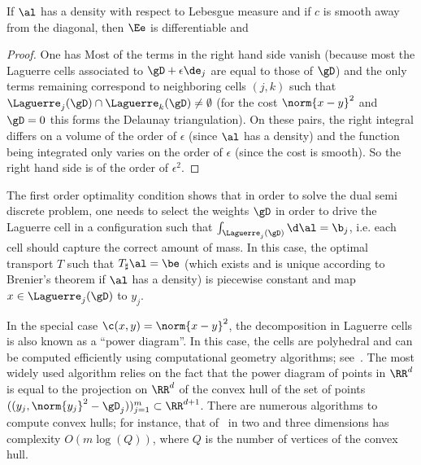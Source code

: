 \begin{prop}
If $\al$ has a density with respect to Lebesgue measure and if $c$ is smooth away from the diagonal, then $\Ee$ is differentiable and
\end{prop}
\begin{proof} 
	One has
	Most of the terms in the right hand side vanish (because most the Laguerre cells associated to $\gD+\epsilon\de_j$ are equal to those of $\gD$) and the only terms remaining correspond to neighboring cells $(j,k)$ such that 
	$\Laguerre_{j}(\gD) \cap \Laguerre_{k}(\gD) \neq \emptyset$ (for the cost $\norm{x-y}^2$ and $\gD=0$ this forms the Delaunay triangulation).
	On these pairs, the right integral differs on a volume of the order of $\epsilon$ (since $\al$ has a density) and the function being integrated only varies on the order of $\epsilon$ (since the cost is smooth). So the right hand side is of the order of $\epsilon^2$.
\end{proof}

The first order optimality condition shows that in order to solve the dual semi discrete problem, one needs to select the weights $\gD$ in order to drive the Laguerre cell in a configuration such that $\int_{\Laguerre_{j}(\gD)} \d\al = \b_j$, i.e. each cell should capture the correct amount of mass. In this case, the optimal transport $T$ such that $T_\sharp \al=\be$ (which exists and is unique according to Brenier's theorem if $\al$ has a density) is piecewise constant and map $x \in \Laguerre_{j}(\gD)$ to $y_j$.  

In the special case $\c(x,y)=\norm{x-y}^2$, the decomposition in Laguerre cells is also known as a ``power diagram''.  
%
In this case, the cells are polyhedral and can be computed efficiently using computational geometry algorithms; see~\cite{aurenhammer1987power}. 
%
The most widely used algorithm relies on the fact that the power diagram of points in $\RR^d$ is equal to the projection on $\RR^d$ of the convex hull of the set of points $( (y_j,\norm{y_j}^2 - \gD_j) )_{j=1}^m \subset \RR^{d+1}$. There are numerous algorithms to compute convex hulls; for instance, that of~\cite{chan1996optimal} in two and three dimensions has complexity $O(m\log(Q))$, where $Q$ is the number of vertices of the convex hull.


